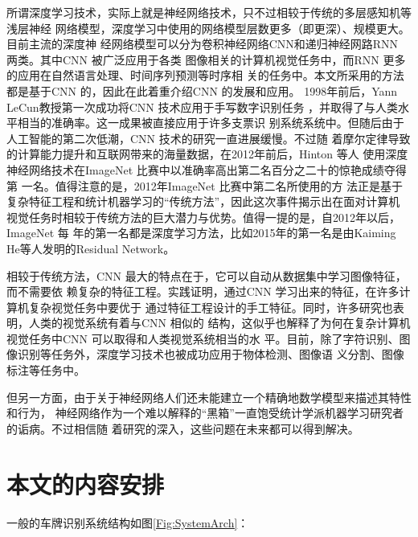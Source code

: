 所谓深度学习技术，实际上就是神经网络技术，只不过相较于传统的多层感知机等浅层神经
网络模型，深度学习中使用的网络模型层数更多（即更深）、规模更大。目前主流的深度神
经网络模型可以分为卷积神经网络CNN和递归神经网路RNN 两类。其中CNN 被广泛应用于各类
图像相关的计算机视觉任务中，而RNN 更多的应用在自然语言处理、时间序列预测等时序相
关的任务中。本文所采用的方法都是基于CNN 的，因此在此着重介绍CNN 的发展和应用。
1998年前后，Yann LeCun教授第一次成功将CNN 技术应用于手写数字识别任务
\cite{LeCun:1990vp}，并取得了与人类水平相当的准确率。这一成果被直接应用于许多支票识
别系统系统中。但随后由于人工智能的第二次低潮，CNN 技术的研究一直进展缓慢。不过随
着摩尔定律导致的计算能力提升和互联网带来的海量数据，在2012年前后，Hinton 等人
使用深度神经网络技术在ImageNet 比赛中以准确率高出第二名百分之二十的惊艳成绩夺得第
一名\cite{Krizhevsky:2012wl}。值得注意的是，2012年ImageNet 比赛中第二名所使用的方
法正是基于复杂特征工程和统计机器学习的“传统方法”，因此这次事件揭示出在面对计算机
视觉任务时相较于传统方法的巨大潜力与优势。值得一提的是，自2012年以后，ImageNet 每
年的第一名都是深度学习方法，比如2015年的第一名是由Kaiming He等人发明的Residual
Network\cite{He:2015tt}。

相较于传统方法，CNN 最大的特点在于，它可以自动从数据集中学习图像特征，而不需要依
赖复杂的特征工程。实践证明，通过CNN 学习出来的特征，在许多计算机复杂视觉任务中要优于
通过特征工程设计的手工特征。同时，许多研究也表明，人类的视觉系统有着与CNN 相似的
结构，这似乎也解释了为何在复杂计算机视觉任务中CNN 可以取得和人类视觉系统相当的水
平。目前，除了字符识别、图像识别等任务外，深度学习技术也被成功应用于物体检测、图像语
义分割、图像标注等任务中。

但另一方面，由于关于神经网络人们还未能建立一个精确地数学模型来描述其特性和行为，
神经网络作为一个难以解释的“黑箱”一直饱受统计学派机器学习研究者的诟病。不过相信随
着研究的深入，这些问题在未来都可以得到解决。

\section{本文的内容安排}

一般的车牌识别系统结构如图\ref{Fig:SystemArch}：

